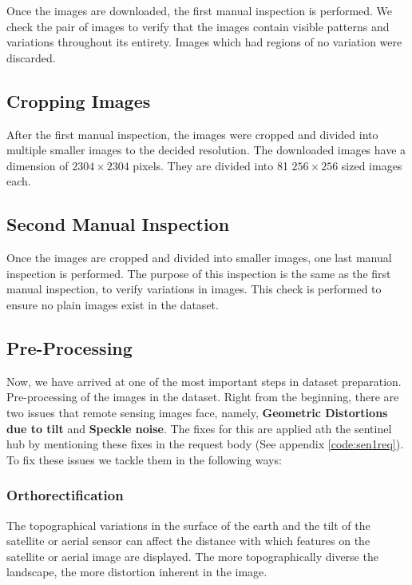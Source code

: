 Once the images are downloaded, the first manual inspection is performed. We check the pair of images to verify that the images contain visible patterns and variations throughout its entirety. Images which had regions of no variation were discarded.

\subsection{Cropping Images}

After the first manual inspection, the images were cropped and divided into multiple smaller images to the decided resolution. The downloaded images have a dimension of $2304\times2304$ pixels. They are divided into 81 $256\times256$ sized images each.

\subsection{Second Manual Inspection}

Once the images are cropped and divided into smaller images, one last manual inspection is performed. The purpose of this inspection is the same as the first manual inspection, to verify variations in images. This check is performed to ensure no plain images exist in the dataset.

\subsection{Pre-Processing}

Now, we have arrived at one of the most important steps in dataset preparation. Pre-processing of the images in the dataset. Right from the beginning, there are two issues that remote sensing images face, namely, \textbf{Geometric Distortions due to tilt} and \textbf{Speckle noise}. The fixes for this are applied ath the sentinel hub by mentioning these fixes in the request body (See appendix \ref{code:sen1req}). To fix these issues we tackle them in the following ways:

\subsubsection{Orthorectification}

The topographical variations in the surface of the earth and the tilt of the satellite or aerial sensor can affect the distance with which features on the satellite or aerial image are displayed. The more topographically diverse the landscape, the more distortion inherent in the image.

